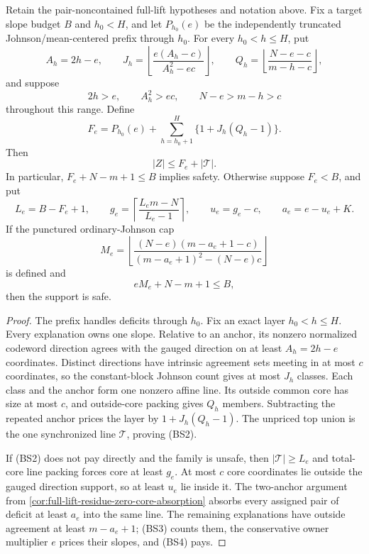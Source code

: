 \documentclass[11pt,a4paper]{amsart}
\numberwithin{equation}{section}
\theoremstyle{remark}
\begin{document}
\begin{corollary}
\label{cor:full-lift-fixed-cutoff-boundary-stack}
Retain the pair-noncontained full-lift hypotheses and notation above.  Fix
a target slope budget $B$ and $h_0<H$, and let $P_{h_0}(e)$ be the independently truncated
Johnson/mean-centered prefix through $h_0$.  For every $h_0<h\le H$, put
\[
 A_h=2h-e,
 \qquad
 J_h=\left\lfloor\frac{e(A_h-c)}{A_h^2-ec}\right\rfloor,
 \qquad
 Q_h=\left\lfloor\frac{N-e-c}{m-h-c}\right\rfloor,
\]
and suppose
\[
 2h>e,\qquad A_h^2>ec,\qquad N-e>m-h>c
\]
throughout this range.  Define
\[
 F_e=P_{h_0}(e)+\sum_{h=h_0+1}^{H}\{1+J_h(Q_h-1)\}.
 \tag{BS1}
\]
Then
\[
 |Z|\le F_e+|\mathcal T|.                           \tag{BS2}
\]
In particular, $F_e+N-m+1\le B$ implies safety.  Otherwise suppose
$F_e<B$, and put
\[
 L_e=B-F_e+1,
 \qquad
 g_e=\left\lceil\frac{L_em-N}{L_e-1}\right\rceil,
 \qquad
 u_e=g_e-c,
 \qquad
 a_e=e-u_e+K.
\]
If the punctured ordinary-Johnson cap
\[
 M_e=\left\lfloor
 \frac{(N-e)(m-a_e+1-c)}{(m-a_e+1)^2-(N-e)c}
 \right\rfloor                                      \tag{BS3}
\]
is defined and
\[
 eM_e+N-m+1\le B,                                  \tag{BS4}
\]
then the support is safe.
\end{corollary}

\begin{proof}
The prefix handles deficits through $h_0$.  Fix an exact layer
$h_0<h\le H$.  Every explanation owns one slope.  Relative to an anchor,
its nonzero normalized codeword direction agrees with the gauged direction
on at least $A_h=2h-e$ coordinates.  Distinct directions have intrinsic
agreement sets meeting in at most $c$ coordinates, so the constant-block
Johnson count gives at most $J_h$ classes.  Each class and the anchor form
one nonzero affine line.  Its outside common core has size at most $c$, and
outside-core packing gives $Q_h$ members.  Subtracting the repeated anchor
prices the layer by $1+J_h(Q_h-1)$.  The unpriced top union is the one
synchronized line $\mathcal T$, proving (BS2).

If (BS2) does not pay directly and the family is unsafe, then
$|\mathcal T|\ge L_e$ and total-core line packing forces core at least
$g_e$.  At most $c$ core coordinates lie outside the gauged direction
support, so at least $u_e$ lie inside it.  The two-anchor argument from
\cref{cor:full-lift-residue-zero-core-absorption} absorbs every assigned
pair of deficit at least $a_e$ into the same line.  The remaining
explanations have outside agreement at least $m-a_e+1$; (BS3) counts them,
the conservative owner multiplier $e$ prices their slopes, and (BS4) pays.
\end{proof}
\end{document}
